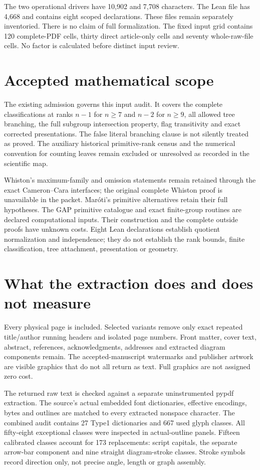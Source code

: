 \documentclass[11pt,a4paper]{article}
\begin{document}
The two operational drivers have 10,902 and 7,708 characters. The Lean file has 4,668 and contains eight scoped declarations. These files remain separately inventoried. There is no claim of full formalization. The fixed input grid contains 120 complete-PDF cells, thirty direct article-only cells and seventy whole-raw-file cells. No factor is calculated before distinct input review.
\newpage
\section*{Accepted mathematical scope}
The existing admission governs this input audit. It covers the complete classifications at ranks $n-1$ for $n\geq7$ and $n-2$ for $n\geq9$, all allowed tree branching, the full subgroup intersection property, flag transitivity and exact corrected presentations. The false literal branching clause is not silently treated as proved. The auxiliary historical primitive-rank census and the numerical convention for counting leaves remain excluded or unresolved as recorded in the scientific map.

Whiston's maximum-family and omission statements remain retained through the exact Cameron--Cara interfaces; the original complete Whiston proof is unavailable in the packet. Mar\'oti's primitive alternatives retain their full hypotheses. The GAP primitive catalogue and exact finite-group routines are declared computational inputs. Their construction and the complete outside proofs have unknown costs. Eight Lean declarations establish quotient normalization and independence; they do not establish the rank bounds, finite classification, tree attachment, presentation or geometry.

\section*{What the extraction does and does not measure}
Every physical page is included. Selected variants remove only exact repeated title/author running headers and isolated page numbers. Front matter, cover text, abstract, references, acknowledgments, addresses and extracted diagram components remain. The accepted-manuscript watermarks and publisher artwork are visible graphics that do not all return as text. Full graphics are not assigned zero cost.

The returned raw text is checked against a separate uninstrumented pypdf extraction. The source's actual embedded font dictionaries, effective encodings, bytes and outlines are matched to every extracted nonspace character. The combined audit contains 27 Type1 dictionaries and 667 used glyph classes. All fifty-eight exceptional classes were inspected in actual-outline panels. Fifteen calibrated classes account for 173 replacements: script capitals, the separate arrow-bar component and nine straight diagram-stroke classes. Stroke symbols record direction only, not precise angle, length or graph assembly.
\end{document}
